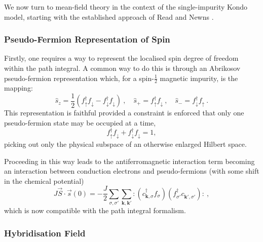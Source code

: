 We now turn to mean-field theory in the context of the single-impurity Kondo model, starting with the established approach of Read and Newns \cite{ReadNewns}.

\subsubsection{Pseudo-Fermion Representation of Spin}
\label{subsubsec:pseudo-fermion}

Firstly, one requires a way to represent the localised spin degree of freedom within the path integral. A common way to do this is through an Abrikosov pseudo-fermion representation which, for a spin-$\frac{1}{2}$ magnetic impurity, is the mapping:
\begin{equation}
\hat{s}_{z} = \frac{1}{2} \left( f^{\dagger}_{\uparrow} f^{}_{\downarrow} - f^{\dagger}_{\downarrow} f^{}_{\downarrow} \right)~, \quad \hat{s}_{+} = f^{\dagger}_{\uparrow} f^{}_{\downarrow}~, \quad \hat{s}_{-} = f^{\dagger}_{\downarrow} f^{}_{\uparrow}~.
\end{equation}
This representation is faithful provided a constraint is enforced that only one pseudo-fermion state may be occupied at a time,
\begin{equation}
f^{\dagger}_{\uparrow} f^{}_{\downarrow} + f^{\dagger}_{\downarrow} f^{}_{\downarrow} = 1,
\end{equation}
picking out only the physical subspace of an otherwise enlarged Hilbert space.

Proceeding in this way leads to the antiferromagnetic interaction term becoming an interaction between conduction electrons and pseudo-fermions (with some shift in the chemical potential)
\begin{equation}
J\vec{S}\cdot\vec{s}(0) = - \frac{J}{2} \sum_{\sigma, \sigma'} \sum_{\boldsymbol{k}, \boldsymbol{k'}} : \left( c^{\dagger}_{\boldsymbol{k}, \sigma} f^{}_{\sigma} \right) \left( f^{\dagger}_{\sigma'} c^{}_{\boldsymbol{k'}, \sigma'} \right): ~,
\label{eq:interaction}
\end{equation}
which is now compatible with the path integral formalism.

\subsubsection{Hybridisation Field}

